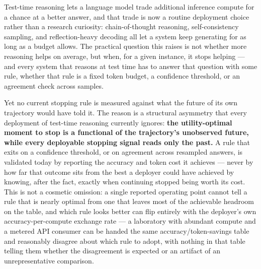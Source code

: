 \documentclass[11pt]{article}
\begin{document}
Test-time reasoning lets a language model trade additional inference compute for a chance at a better answer, and that trade is now a routine deployment choice rather than a research curiosity: chain-of-thought reasoning, self-consistency sampling, and reflection-heavy decoding all let a system keep generating for as long as a budget allows. The practical question this raises is not whether more reasoning helps on average, but when, for a given instance, it stops helping --- and every system that reasons at test time has to answer that question with some rule, whether that rule is a fixed token budget, a confidence threshold, or an agreement check across samples.

Yet no current stopping rule is measured against what the future of its own trajectory would have told it. The reason is a structural asymmetry that every deployment of test-time reasoning currently ignores: \textbf{the utility-optimal moment to stop is a functional of the trajectory's unobserved future, while every deployable stopping signal reads only the past.} A rule that exits on a confidence threshold, or on agreement across resampled answers, is validated today by reporting the accuracy and token cost it achieves --- never by how far that outcome sits from the best a deployer could have achieved by knowing, after the fact, exactly when continuing stopped being worth its cost. This is not a cosmetic omission: a single reported operating point cannot tell a rule that is nearly optimal from one that leaves most of the achievable headroom on the table, and which rule looks better can flip entirely with the deployer's own accuracy-per-compute exchange rate --- a laboratory with abundant compute and a metered API consumer can be handed the same accuracy/token-savings table and reasonably disagree about which rule to adopt, with nothing in that table telling them whether the disagreement is expected or an artifact of an unrepresentative comparison.
\end{document}
